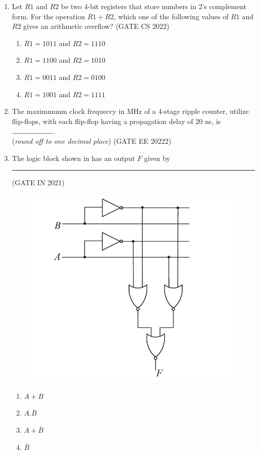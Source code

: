 \begin{enumerate}[label=\arabic*.,ref=\theenumi]
\item Let $R1$ and $R2$ be two $4$-bit registers that store numbers in $2$’s complement form.
For the operation $R1+R2$, which one of the following values of $R1$ and $R2$ gives an
arithmetic overflow?
\hfill{(GATE CS 2022)}

    \begin{enumerate}
        \item $R1 = 1011$ and $R2 = 1110$
        \item $R1 = 1100$ and $R2 = 1010$
        \item $R1 = 0011$ and $R2 = 0100$
        \item $R1 = 1001$ and $R2 = 1111$
    \end{enumerate}


\item The maximmunm clock frequeccy in MHz of a $4$-stage ripple counter, utilize flip-flops, with each flip-flop having a propagation delay of $20$ ns, is $\rule{2cm}{0.15mm}$.\\
(\textit{round off to one decimal place})
\hfill{(GATE EE 20222)}

\item The logic block shown 
in
	has an output $F$ given by \rule{2cm}{0.15mm}
\hfill (GATE IN 2021)
\begin{figure}[!ht]
\centering
\includegraphics[width=\columnwidth]{figs/gatemage.jpg}
	\caption{}
\label{fig:GATE IN 2021}
\end{figure}
\begin{enumerate}
	\item$A+B$
	\item$A.\bar{B}$
	\item$A+\bar{B}$
	\item$\bar{B}$
\end{enumerate}


\end{enumerate}
